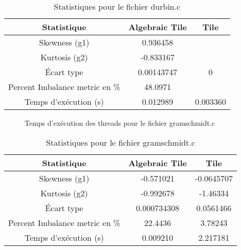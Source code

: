 \documentclass{article}
\begin{document}
\begin{table}[htbp]
  \centering
  \caption{Statistiques pour le fichier durbin.c}
  \begin{tabular}{|c|c|c|}
    \hline
    Statistique & Algebraic Tile & Tile \\ 
    \hline
    Skewness (g1) & 0.936458 &  \\ 
    Kurtosis (g2) & -0.833167 &  \\ 
    Écart type & 0.00143747 & 0 \\ 
    Percent Imbalance metric en \% & 48.0971 &  \\ 
    Temps d'exécution (s) &  0.012989      &  0.003360    \\ 
    \hline
  \end{tabular}
\end{table}
\newpage

\begin{figure}
  \centering
  \caption{Temps d'exécution des threads pour le fichier gramschmidt.c}
  \label{fig:gramschmidt.c}
\end{figure}

\begin{table}[htbp]
  \centering
  \caption{Statistiques pour le fichier gramschmidt.c}
  \begin{tabular}{|c|c|c|}
    \hline
    Statistique & Algebraic Tile & Tile \\ 
    \hline
    Skewness (g1) & -0.571021 & -0.0645707 \\ 
    Kurtosis (g2) & -0.992678 & -1.46334 \\ 
    Écart type & 0.000734308 & 0.0561466 \\ 
    Percent Imbalance metric en \% & 22.4436 & 3.78243 \\ 
    Temps d'exécution (s) &  0.009210        &  2.217181    \\ 
    \hline
  \end{tabular}
\end{table}
\newpage
\end{document}
